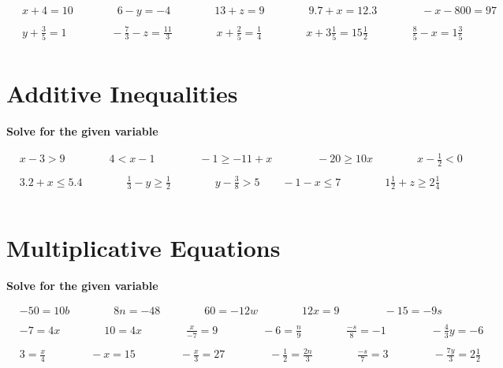 \documentclass{article}
\begin{document}
\bigskip

\(\begin{aligned}
	&x+4=10 \qquad\qquad 6-y=-4 \qquad\qquad 13+z=9 \qquad\qquad 9.7+x=12.3 \qquad\qquad -x-800=97\\\\
	&y+\frac{3}{5}=1 \qquad\qquad -\frac{7}{3}-z=\frac{11}{3} \qquad\qquad x+\frac{2}{5}=\frac{1}{4} \qquad\qquad  x+3\frac{1}{5}=15\frac{1}{2} \qquad\qquad \frac{8}{5}-x=1\frac{3}{5}\\\
\end{aligned}\)

\bigskip

\section{Additive Inequalities}
\bigskip
\textbf{Solve for the given variable}

\bigskip

\(\begin{aligned}
	&x-3>9 \qquad\qquad 4<x-1 \qquad\qquad -1\ge-11+x \qquad\qquad -20\ge10x \qquad\qquad x-\frac{1}{2} <0\\\\
	&3.2+x\le5.4 \qquad\qquad \frac{1}{3}-y\ge\frac{1}{2} \qquad\qquad y-\frac{3}{8}>5 \qquad -1-x\le7 \qquad\qquad 1\frac{1}{2}+z\ge2\frac{1}{4}\\\\
\end{aligned}\)

\bigskip

\section{Multiplicative Equations}
\bigskip
\textbf{Solve for the given variable}

\bigskip

\(\begin{aligned}
	&-50=10b \qquad\qquad 8n=-48 \qquad\qquad 60=-12w \qquad\qquad  12x=9 \qquad\qquad -15=-9s\\\\
	&-7=4x \qquad\qquad 10=4x \qquad\qquad \frac{x}{-7}=9 \qquad\qquad -6=\frac{n}{9} \qquad\qquad \frac{-s}{8}=-1 \qquad\qquad -\frac{4}{3}y=-6\\\\
	&3=\frac{x}{4} \qquad\qquad -x=15 \qquad\qquad -\frac{x}{3}=27 \qquad\qquad -\frac{1}{2}=\frac{2n}{3} \qquad\qquad \frac{-s}{7}=3 \qquad\qquad -\frac{7y}{3}=2\frac{1}{2}\\\\
\end{aligned}\)
\end{document}

